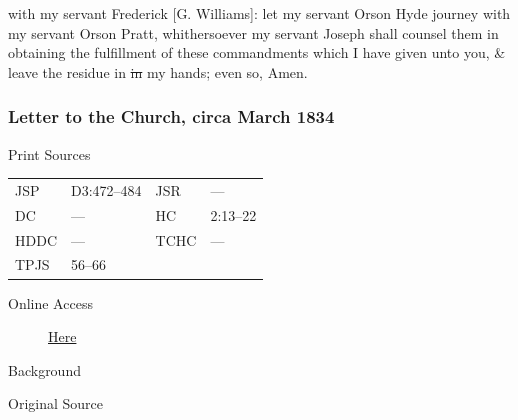 with my servant Frederick [G. Williams]: let my servant Orson Hyde journey with my servant Orson Pratt, whithersoever my servant Joseph shall counsel them in obtaining the fulfillment of these commandments which I have given unto you, \& leave the residue in \sout{in} my hands; even so, Amen.
					
		\subsubsection{Letter to the Church, circa March 1834}
			\label{EMS-1834-JS-CIR-MAR-1834}
			
			\begin{description}
					\item[Print Sources]
				\end{description}

					\begin{tabular}{p{0.5in}p{1in}p{0.5in}p{1in}}
					JSP	 	& D3:472--484		& JSR 		& --- \\
					DC	 	& --- 		& HC 		& 2:13--22 \\
					HDDC 	& ---		& TCHC 		& --- \\
					TPJS 	& 56--66			& 	 		&  \\
					\end{tabular}
				
				\begin{description}
					\item[Online Access] \href{https://www.josephsmithpapers.org/paper-summary/letter-to-the-church-circa-march-1834/1}{Here}
				\end{description}
				
				\begin{description}
					\item[Background]
				\end{description}
				
				
				\begin{description}
					\item[Original Source]
				\end{description}
				
